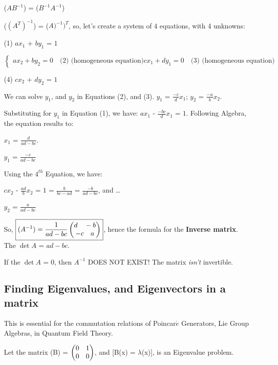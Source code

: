\documentclass[a4paper, 10pt, onepage]{elegantbook}
\begin{document}
{(${AB}^{-1}$) = (${B}^{-1}{A}^{-1}$)  

($({A}^{T})^{-1}$) = (${A)^{-1})^T}$, so, let's create a system of 4 equations, with 4 unknowns:  

(1) $ax_1$ + $by_1$ = $1$  

$
\left\{
\begin{array}{ll}
  ax_2 + by_2 = 0 \quad  \text{(2) (homogeneous equation)} 
  cx_1 + dy_1 = 0 \quad  \text{(3) (homogeneous equation)} 
\end{array}
\right.$  

(4) $cx_2$ + $dy_2$ = $1$  

We can solve $y_1$, and $y_2$ in Equations (2), and (3). $y_1$ = $\frac{-c}{d} {x_1}$; $y_2$ = $\frac{-a}{b} {x_2}$.  

Substituting for $y_1$ in Equation (1), we have: $ax_1$ - $\frac{-bc}{d} {x_1}$ = $1$. Following Algebra, the equation 
results to:  

$x_1$ = $\frac{d}{ad - bc}$.  

$y_1$ = $\frac{-c}{ad - bc}$  

Using the $4^{th}$ Equation, we have:  

$cx_2$ - $\frac{ad}{b} {x_2}$ = $1$ = $\frac{b}{bc - ad}$ = $\frac{-b}{ad - bc}$, and \ldots  

$y_2$ = $\frac{a}{ad - bc}$

So, $\boxed{({A}^{-1}) = \frac{1}{ad - bc} \begin{pmatrix}d \quad -b \cr -c \quad a \end{pmatrix}}$, hence the formula 
for the \textbf{Inverse matrix}.  \\

The $\det{A}$ = $ad - bc$. 

If the $\det{A}$ = $0$, then $A^{-1}$ DOES NOT EXIST! The matrix \emph{isn't} invertible.

\subsection{Finding Eigenvalues, and Eigenvectors in a matrix}

This is essential for the commutation relations of Poincar$\acute{e}$ Generators, Lie Group Algebras, in Quantum Field 
Theory.  

Let the matrix (B) =  $\begin{pmatrix}0 \quad 1 \cr 0 \quad 0 \end{pmatrix}$, and [B(x) = $\lambda$(x)], is an 
Eigenvalue problem.  \\

}
\end{document}
